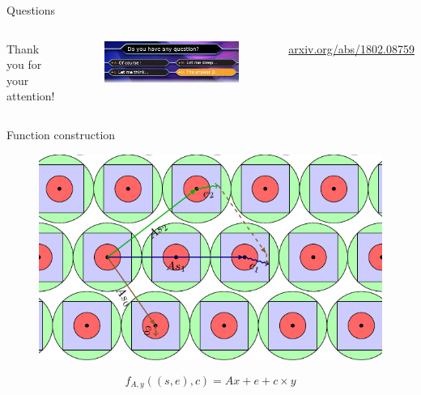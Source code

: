 \documentclass[table]{beamer}
\begin{document}
\begin{frame}{Questions}
  \begin{columns}
    \column{\dimexpr\paperwidth}
    \begin{center}
      Thank you for your attention!\\
    \end{center}
    \begin{figure}[ht]
      \centering
      \includegraphics[width=.8\textwidth]{figures/millionnaire.png}
    \end{figure}
    \begin{center}
    \href{https://arxiv.org/abs/1802.08759}{arxiv.org/abs/1802.08759}
    \end{center}
    \end{columns}
\end{frame}

\begin{frame}[noframenumbering]{Function construction}
  \begin{figure}[ht]
    \centering
    \includegraphics[width=.8\textwidth]{figures/example_dimension2.pdf}
  \end{figure}
  $$f_{A,y}((s,e),c) = Ax + e + c \times y$$
\end{frame}
\end{document}
